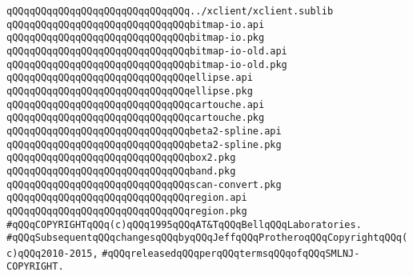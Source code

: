 \verb|qQQqqQQqqQQqqQQqqQQqqQQqqQQqqQQq../xclient/xclient.sublib|\newline
\newline
\verb|qQQqqQQqqQQqqQQqqQQqqQQqqQQqqQQqbitmap-io.api|\newline
\verb|qQQqqQQqqQQqqQQqqQQqqQQqqQQqqQQqbitmap-io.pkg|\newline
\newline
\verb|qQQqqQQqqQQqqQQqqQQqqQQqqQQqqQQqbitmap-io-old.api|\newline
\verb|qQQqqQQqqQQqqQQqqQQqqQQqqQQqqQQqbitmap-io-old.pkg|\newline
\newline
\verb|qQQqqQQqqQQqqQQqqQQqqQQqqQQqqQQqellipse.api|\newline
\verb|qQQqqQQqqQQqqQQqqQQqqQQqqQQqqQQqellipse.pkg|\newline
\newline
\verb|qQQqqQQqqQQqqQQqqQQqqQQqqQQqqQQqcartouche.api|\newline
\verb|qQQqqQQqqQQqqQQqqQQqqQQqqQQqqQQqcartouche.pkg|\newline
\newline
\verb|qQQqqQQqqQQqqQQqqQQqqQQqqQQqqQQqbeta2-spline.api|\newline
\verb|qQQqqQQqqQQqqQQqqQQqqQQqqQQqqQQqbeta2-spline.pkg|\newline
\newline
\verb|qQQqqQQqqQQqqQQqqQQqqQQqqQQqqQQqbox2.pkg|\newline
\verb|qQQqqQQqqQQqqQQqqQQqqQQqqQQqqQQqband.pkg|\newline
\verb|qQQqqQQqqQQqqQQqqQQqqQQqqQQqqQQqscan-convert.pkg|\newline
\verb|qQQqqQQqqQQqqQQqqQQqqQQqqQQqqQQqregion.api|\newline
\verb|qQQqqQQqqQQqqQQqqQQqqQQqqQQqqQQqregion.pkg|\newline
\newline
\newline
\newline
\verb|#qQQqCOPYRIGHTqQQq(c)qQQq1995qQQqAT&TqQQqBellqQQqLaboratories.|\newline
\verb|#qQQqSubsequentqQQqchangesqQQqbyqQQqJeffqQQqProtheroqQQqCopyrightqQQq(c)qQQq2010-2015,|\newline
\verb|#qQQqreleasedqQQqperqQQqtermsqQQqofqQQqSMLNJ-COPYRIGHT.|\newline

